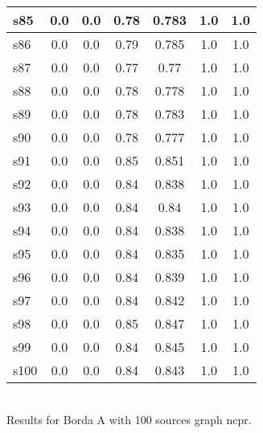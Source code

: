 \documentclass{article}
\begin{document}
\begin{tabular}{|l|c|c|c|c|c|c|}
\hline
s85 &0.0 & 0.0 & 0.78 & 0.783 & 1.0 & 1.0\\
\hline
s86 &0.0 & 0.0 & 0.79 & 0.785 & 1.0 & 1.0\\
\hline
s87 &0.0 & 0.0 & 0.77 & 0.77 & 1.0 & 1.0\\
\hline
s88 &0.0 & 0.0 & 0.78 & 0.778 & 1.0 & 1.0\\
\hline
s89 &0.0 & 0.0 & 0.78 & 0.783 & 1.0 & 1.0\\
\hline
s90 &0.0 & 0.0 & 0.78 & 0.777 & 1.0 & 1.0\\
\hline
s91 &0.0 & 0.0 & 0.85 & 0.851 & 1.0 & 1.0\\
\hline
s92 &0.0 & 0.0 & 0.84 & 0.838 & 1.0 & 1.0\\
\hline
s93 &0.0 & 0.0 & 0.84 & 0.84 & 1.0 & 1.0\\
\hline
s94 &0.0 & 0.0 & 0.84 & 0.838 & 1.0 & 1.0\\
\hline
s95 &0.0 & 0.0 & 0.84 & 0.835 & 1.0 & 1.0\\
\hline
s96 &0.0 & 0.0 & 0.84 & 0.839 & 1.0 & 1.0\\
\hline
s97 &0.0 & 0.0 & 0.84 & 0.842 & 1.0 & 1.0\\
\hline
s98 &0.0 & 0.0 & 0.85 & 0.847 & 1.0 & 1.0\\
\hline
s99 &0.0 & 0.0 & 0.84 & 0.845 & 1.0 & 1.0\\
\hline
s100 &0.0 & 0.0 & 0.84 & 0.843 & 1.0 & 1.0\\
\hline
\end{tabular}\\

\noindent Results for Borda A with 100 sources graph ncpr.
\end{document}
